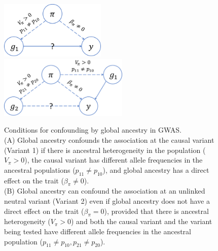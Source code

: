 \documentclass[12pt]{article}
\begin{document}
\begin{figure}
\includegraphics[width=0.45\textwidth]{figs/confounding_dags/dag_gwas_1_v2.png}
\includegraphics[width=0.55\textwidth]{figs/confounding_dags/dag_gwas_2_v2.png}
\caption{Conditions for confounding by global ancestry in GWAS. \\(A) Global ancestry confounds the association at the causal variant (Variant 1) if there is ancestral heterogeneity in the population ($V_\pi > 0$), the causal variant has different allele frequencies in the ancestral populations ($p_{11} \neq p_{10}$), and global ancestry has a direct effect on the trait ($\beta_\pi \neq 0$). \\(B) Global ancestry can confound the association at an unlinked neutral variant (Variant 2) even if global ancestry does not have a direct effect on the trait ($\beta_\pi = 0$), provided that there is ancestral heterogeneity ($V_\pi > 0$) and both the causal variant and the variant being tested have different allele frequencies in the ancestral population ($p_{11} \neq p_{10}, p_{21} \neq p_{20}$).}
\label{fig:confoundingdags}
\end{figure}
\end{document}
